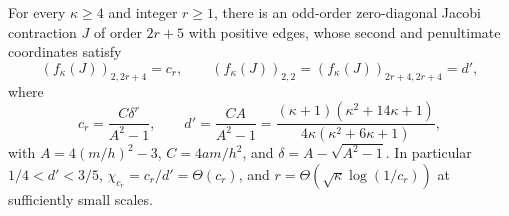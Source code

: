 \begin{proposition}\label{prop:witness-diagonal}
For every $\kappa\geq4$ and integer $r\geq1$, there is an odd-order
zero-diagonal Jacobi contraction $J$ of order $2r+5$ with positive
edges, whose second and penultimate coordinates satisfy
\begin{equation}\label{eq:witness-values}
 (f_\kappa(J))_{2,2r+4}=c_r,\qquad
 (f_\kappa(J))_{2,2}=(f_\kappa(J))_{2r+4,2r+4}=d',
\end{equation}
where
\[
 c_r=\frac{C\delta^r}{A^2-1},\qquad
 d'=\frac{CA}{A^2-1}
 =\frac{(\kappa+1)(\kappa^2+14\kappa+1)}
 {4\kappa(\kappa^2+6\kappa+1)},
\]
with $A=4(m/h)^2-3$, $C=4am/h^2$, and
$\delta=A-\sqrt{A^2-1}$. In particular $1/4<d'<3/5$,
$\chi_{c_r}=c_r/d'=\Theta(c_r)$, and
$r=\Theta(\sqrt\kappa\log(1/c_r))$ at sufficiently small scales.
\end{proposition}
